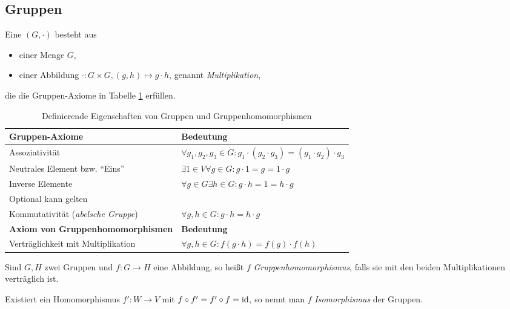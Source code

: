 \subsection{Gruppen}

\begin{definition}\label{gruppen:def}
Eine  $(G,\cdot)$ besteht aus
\begin{itemize}
	\item einer Menge $G$,
	\item einer Abbildung $\cdot: G\times G, (g,h) \mapsto g\cdot h$, genannt \emph{Multiplikation},
\end{itemize}
die die Gruppen-Axiome in Tabelle \ref{gruppen:def_table} erfüllen.

\begin{table}[!ht]
	\setlength\extrarowheight{10pt} %
	\begin{tabularx}{\textwidth}{p{7cm} X}
		
		\toprule
		\textbf{Gruppen-Axiome}                               & \textbf{Bedeutung} \\
		\midrule
        \hspace{1cm}Assoziativität                           & $\forall g_1,g_2,g_3\in G: g_1\cdot(g_2\cdot g_3) = (g_1\cdot g_2)\cdot g_3$ \\
		\hspace{1cm}Neutrales Element bzw. \enquote{Eins}    & $\exists 1\in V\forall g\in G: g\cdot 1 = g = 1\cdot g$  \\
		\hspace{1cm}Inverse Elemente                         & $\forall g \in G\exists h \in G: g\cdot h = 1 = h\cdot g$ \\
		Optional kann gelten & \\
        \hspace{1cm}Kommutativität (\emph{abelsche Gruppe})  & $\forall g,h\in G: g\cdot h=h\cdot g$ \\
        \textbf{Axiom von Gruppenhomomorphismen}             & \textbf{Bedeutung} \\
        \midrule
        Verträglichkeit mit Multiplikation & $\forall g,h\in G: f(g\cdot h) = f(g)\cdot f(h)$ \\
        \bottomrule
	\end{tabularx}
	\caption{Definierende Eigenschaften von Gruppen und Gruppenhomomorphismen}
    \label{gruppen:def_table}
\end{table}

Sind $G,H$ zwei Gruppen und $f: G\to H$ eine Abbildung, so heißt $f$ \emph{Gruppenhomomorphismus}, falls sie mit den beiden Multiplikationen verträglich ist.

Existiert ein Homomorphismus $f': W\to V$ mit $f\circ f'=f'\circ f=\operatorname{id}$, so nennt man $f$ \emph{Isomorphismus} der Gruppen.
\end{definition}

